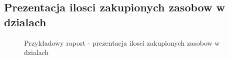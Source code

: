\subsection{Prezentacja ilosci zakupionych zasobow w dzialach}
\begin{figure}[H]
	\centering
        \vfill
        \noindent
	\caption{Przykładowy raport - prezentacja ilosci zakupionych zasobow w dzialach}
\end{figure}
